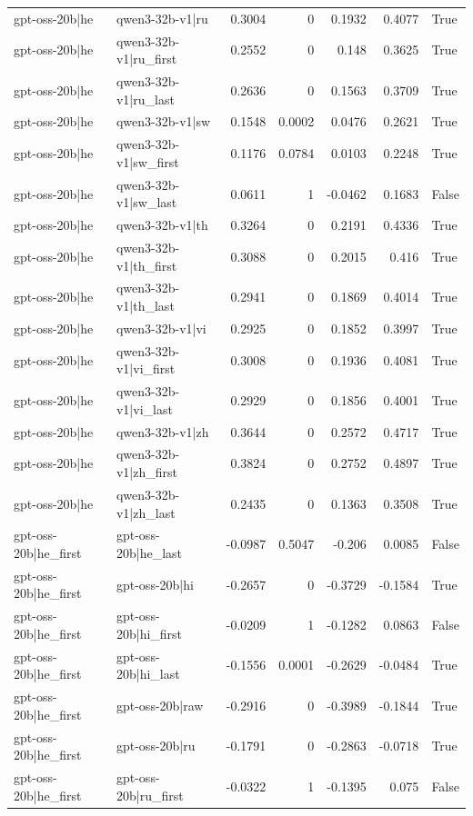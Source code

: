 \begin{table}
\begin{tabular}{l l r r r r l}
gpt-oss-20b|he & qwen3-32b-v1|ru & 0.3004 & 0 & 0.1932 & 0.4077 & True \\
gpt-oss-20b|he & qwen3-32b-v1|ru_first & 0.2552 & 0 & 0.148 & 0.3625 & True \\
gpt-oss-20b|he & qwen3-32b-v1|ru_last & 0.2636 & 0 & 0.1563 & 0.3709 & True \\
gpt-oss-20b|he & qwen3-32b-v1|sw & 0.1548 & 0.0002 & 0.0476 & 0.2621 & True \\
gpt-oss-20b|he & qwen3-32b-v1|sw_first & 0.1176 & 0.0784 & 0.0103 & 0.2248 & True \\
gpt-oss-20b|he & qwen3-32b-v1|sw_last & 0.0611 & 1 & -0.0462 & 0.1683 & False \\
gpt-oss-20b|he & qwen3-32b-v1|th & 0.3264 & 0 & 0.2191 & 0.4336 & True \\
gpt-oss-20b|he & qwen3-32b-v1|th_first & 0.3088 & 0 & 0.2015 & 0.416 & True \\
gpt-oss-20b|he & qwen3-32b-v1|th_last & 0.2941 & 0 & 0.1869 & 0.4014 & True \\
gpt-oss-20b|he & qwen3-32b-v1|vi & 0.2925 & 0 & 0.1852 & 0.3997 & True \\
gpt-oss-20b|he & qwen3-32b-v1|vi_first & 0.3008 & 0 & 0.1936 & 0.4081 & True \\
gpt-oss-20b|he & qwen3-32b-v1|vi_last & 0.2929 & 0 & 0.1856 & 0.4001 & True \\
gpt-oss-20b|he & qwen3-32b-v1|zh & 0.3644 & 0 & 0.2572 & 0.4717 & True \\
gpt-oss-20b|he & qwen3-32b-v1|zh_first & 0.3824 & 0 & 0.2752 & 0.4897 & True \\
gpt-oss-20b|he & qwen3-32b-v1|zh_last & 0.2435 & 0 & 0.1363 & 0.3508 & True \\
gpt-oss-20b|he_first & gpt-oss-20b|he_last & -0.0987 & 0.5047 & -0.206 & 0.0085 & False \\
gpt-oss-20b|he_first & gpt-oss-20b|hi & -0.2657 & 0 & -0.3729 & -0.1584 & True \\
gpt-oss-20b|he_first & gpt-oss-20b|hi_first & -0.0209 & 1 & -0.1282 & 0.0863 & False \\
gpt-oss-20b|he_first & gpt-oss-20b|hi_last & -0.1556 & 0.0001 & -0.2629 & -0.0484 & True \\
gpt-oss-20b|he_first & gpt-oss-20b|raw & -0.2916 & 0 & -0.3989 & -0.1844 & True \\
gpt-oss-20b|he_first & gpt-oss-20b|ru & -0.1791 & 0 & -0.2863 & -0.0718 & True \\
gpt-oss-20b|he_first & gpt-oss-20b|ru_first & -0.0322 & 1 & -0.1395 & 0.075 & False \\

\end{tabular}
\end{table}
